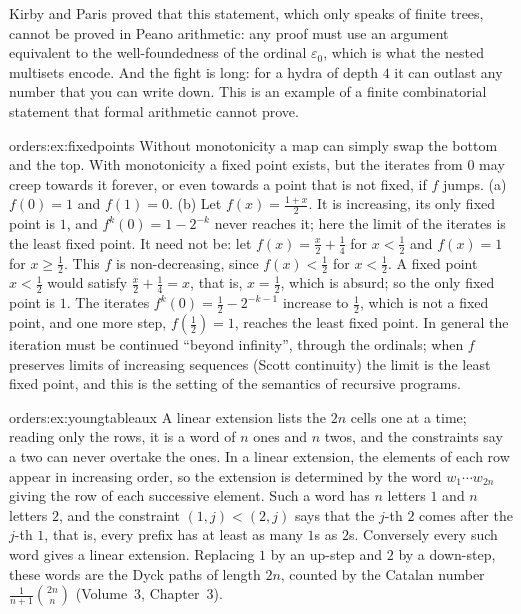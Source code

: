 \begin{remark}
Kirby and Paris proved that this statement, which only speaks of finite trees, cannot be proved in Peano arithmetic: any
proof must use an argument equivalent to the well-foundedness of the ordinal $\varepsilon_0$, which is what the nested multisets
encode. And the fight is long: for a hydra of depth $4$ it can outlast any number that you can write down. This is an example of a finite combinatorial statement that formal arithmetic cannot prove.
\end{remark}

\begin{solution}{orders:ex:fixedpoints}
\idea Without monotonicity a map can simply swap the bottom and the top. With monotonicity a fixed point exists, but the
iterates from $0$ may creep towards it forever, or even towards a point that is not fixed, if $f$ jumps.
\writeup (a) $f(0)=1$ and $f(1)=0$. (b) Let $f(x)=\frac{1+x}2$. It is increasing, its only fixed point is $1$, and $f^k(0)=1-2^{-k}$ never reaches
it; here the limit of the iterates is the least fixed point. It need not be: let $f(x)=\frac x2+\frac14$ for $x<\frac12$ and $f(x)=1$ for
$x\ge\frac12$. This $f$ is non-decreasing, since $f(x)<\frac12$ for $x<\frac12$. A fixed point $x<\frac12$ would satisfy $\frac x2+\frac14=x$, that is, $x=\frac12$, which is
absurd; so the only fixed point is $1$. The iterates $f^k(0)=\frac12-2^{-k-1}$ increase to $\frac12$, which is not a fixed point, and one more
step, $f(\frac12)=1$, reaches the least fixed point. In general the iteration must be continued ``beyond infinity'', through the
ordinals; when $f$ preserves limits of increasing sequences (Scott continuity) the limit is the least fixed point, and
this is the setting of the semantics of recursive programs.
\end{solution}

\begin{solution}{orders:ex:youngtableaux}
\idea A linear extension lists the $2n$ cells one at a time; reading only the rows, it is a word of $n$ ones and $n$ twos, and
the constraints say a two can never overtake the ones.
\writeup In a linear extension, the elements of each row appear in increasing order, so the extension is determined by the word
$w_1\cdots w_{2n}$ giving the row of each successive element. Such a word has $n$ letters $1$ and $n$ letters $2$, and the constraint
$(1,j)<(2,j)$ says that the $j$-th $2$ comes after the $j$-th $1$, that is, every prefix has at least as many $1$s as $2$s. Conversely
every such word gives a linear extension. Replacing $1$ by an up-step and $2$ by a down-step, these words are the Dyck paths of
length $2n$, counted by the Catalan number $\frac1{n+1}\binom{2n}n$ (Volume~3, Chapter~3).
\end{solution}

